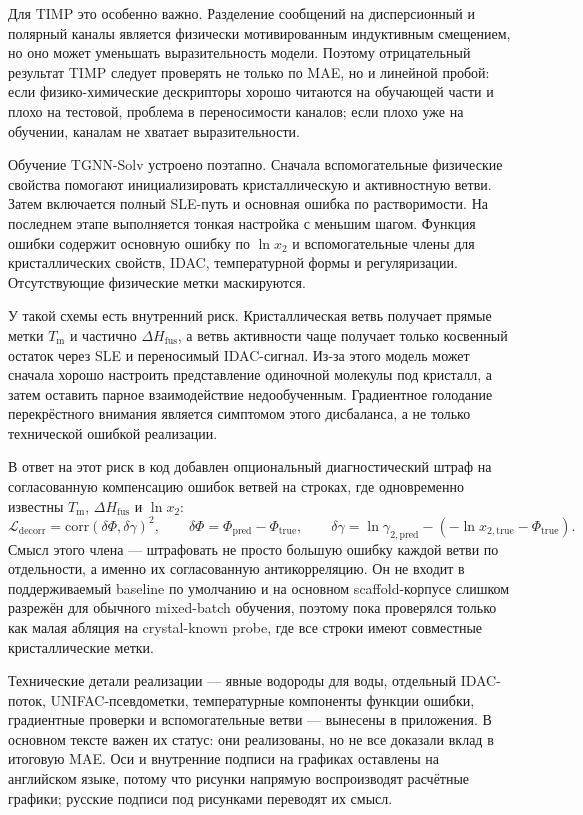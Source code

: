 \documentclass[11pt]{article}
\newcommand{\Tm}{T_{\mathrm m}}
\newcommand{\dHfus}{\Delta H_{\mathrm{fus}}}
\theoremstyle{definition}
\begin{document}
Для TIMP это особенно важно. Разделение сообщений на дисперсионный и полярный каналы является физически мотивированным индуктивным смещением, но оно может уменьшать выразительность модели. Поэтому отрицательный результат TIMP следует проверять не только по MAE, но и линейной пробой: если физико-химические дескрипторы хорошо читаются на обучающей части и плохо на тестовой, проблема в переносимости каналов; если плохо уже на обучении, каналам не хватает выразительности.

Обучение TGNN-Solv устроено поэтапно. Сначала вспомогательные физические свойства помогают инициализировать кристаллическую и активностную ветви. Затем включается полный SLE-путь и основная ошибка по растворимости. На последнем этапе выполняется тонкая настройка с меньшим шагом. Функция ошибки содержит основную ошибку по $\ln x_2$ и вспомогательные члены для кристаллических свойств, IDAC, температурной формы и регуляризации. Отсутствующие физические метки маскируются.

У такой схемы есть внутренний риск. Кристаллическая ветвь получает прямые метки $\Tm$ и частично $\dHfus$, а ветвь активности чаще получает только косвенный остаток через SLE и переносимый IDAC-сигнал. Из-за этого модель может сначала хорошо настроить представление одиночной молекулы под кристалл, а затем оставить парное взаимодействие недообученным. Градиентное голодание перекрёстного внимания является симптомом этого дисбаланса, а не только технической ошибкой реализации.

В ответ на этот риск в код добавлен опциональный диагностический штраф на согласованную компенсацию ошибок ветвей на строках, где одновременно известны $\Tm$, $\dHfus$ и $\ln x_2$:
\begin{equation*}
    \mathcal L_{\mathrm{decorr}}
    =
    \mathrm{corr}(\delta\Phi,\delta\gamma)^2,
    \qquad
    \delta\Phi=\Phi_{\mathrm{pred}}-\Phi_{\mathrm{true}},
    \qquad
    \delta\gamma=
    \ln\gamma_{2,\mathrm{pred}}
    -
    \left(
        -\ln x_{2,\mathrm{true}}-\Phi_{\mathrm{true}}
    \right).
\end{equation*}
Смысл этого члена --- штрафовать не просто большую ошибку каждой ветви по отдельности, а именно их согласованную антикорреляцию. Он не входит в поддерживаемый baseline по умолчанию и на основном scaffold-корпусе слишком разрежён для обычного mixed-batch обучения, поэтому пока проверялся только как малая абляция на crystal-known probe, где все строки имеют совместные кристаллические метки.

Технические детали реализации --- явные водороды для воды, отдельный IDAC-поток, UNIFAC-псевдометки, температурные компоненты функции ошибки, градиентные проверки и вспомогательные ветви --- вынесены в приложения. В основном тексте важен их статус: они реализованы, но не все доказали вклад в итоговую MAE. Оси и внутренние подписи на графиках оставлены на английском языке, потому что рисунки напрямую воспроизводят расчётные графики; русские подписи под рисунками переводят их смысл.
\end{document}
